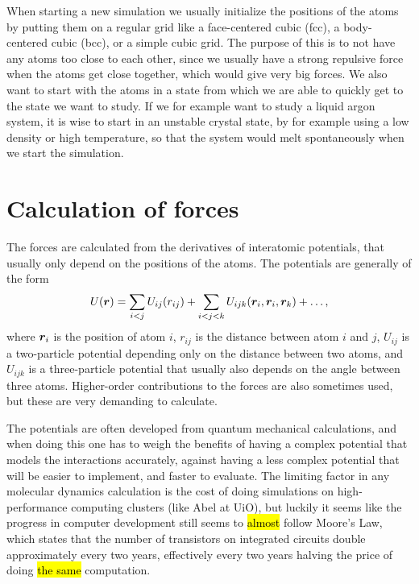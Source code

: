 When starting a new simulation we usually initialize the positions of the atoms by putting them on a regular grid like a face-centered cubic (fcc), a body-centered cubic (bcc), or a simple cubic grid. The purpose of this is to not have any atoms too close to each other, since we usually have a strong repulsive force when the atoms get close together,  which would give very big forces. We also want to start with the atoms in a state from which we are able to quickly get to the state we want to study. If we for example want to study a liquid argon system, it is wise to start in an unstable crystal state, by for example using a low density or high temperature, so that the system would melt spontaneously when we start the simulation.

\section{Calculation of forces\label{sec:program:lj}}
The forces are calculated from the derivatives of interatomic potentials, that usually only depend on the positions of the atoms. The potentials are generally of the form
\begin{align*}
    U(\boldsymbol{r}) = \sum_{i<j} U_{ij}(r_{ij}) + \sum_{i<j<k} U_{ijk}(\boldsymbol{r}_i, \boldsymbol{r}_i, \boldsymbol{r}_k) + \dots,
\end{align*}
where $\boldsymbol{r}_i$ is the position of atom $i$, $r_{ij}$ is the distance between atom $i$ and $j$, $U_{ij}$ is a two-particle potential depending only on the distance between two atoms, and $U_{ijk}$ is a three-particle potential that usually also depends on the angle between three atoms. Higher-order contributions to the forces are also sometimes used, but these are very demanding to calculate.

The potentials are often developed from quantum mechanical calculations, and when doing this one has to weigh the benefits of having a complex potential that models the interactions accurately, against having a less complex potential that will be easier to implement, and faster to evaluate. The limiting factor in any molecular dynamics calculation is the cost of doing simulations on high-performance computing clusters (like Abel at UiO), but luckily it seems like the progress in computer development still seems to \hl{almost} follow Moore's Law\cite{mack2011moore}, which states that the number of transistors on integrated circuits double approximately every two years\cite{moore1965cramming}, effectively every two years halving the price of doing \hl{the same} computation.

